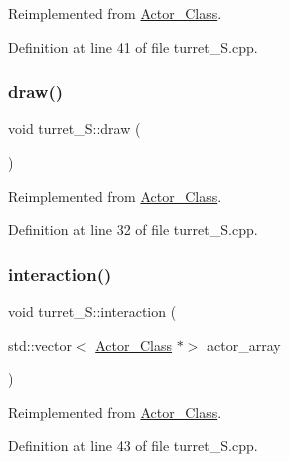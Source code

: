 Reimplemented from \hyperlink{class_actor___class_a9447c6154a674d7e6bdf24ff2874b7a8}{Actor\+\_\+\+Class}.



Definition at line 41 of file turret\+\_\+\+S.\+cpp.

\hypertarget{classturret___s_ad5699c9932a20914961dde81c5a96d86}{}\label{classturret___s_ad5699c9932a20914961dde81c5a96d86} 
\subsubsection{\texorpdfstring{draw()}{draw()}}
{\footnotesize\ttfamily void turret\+\_\+\+S\+::draw (\begin{DoxyParamCaption}{ }\end{DoxyParamCaption})\hspace{0.3cm}{\ttfamily [virtual]}}



Reimplemented from \hyperlink{class_actor___class_ac49cd62be76b4b950ecbe155413f1b64}{Actor\+\_\+\+Class}.



Definition at line 32 of file turret\+\_\+\+S.\+cpp.

\hypertarget{classturret___s_ae7e579ddf3982d6914491784595f1c16}{}\label{classturret___s_ae7e579ddf3982d6914491784595f1c16} 
\subsubsection{\texorpdfstring{interaction()}{interaction()}}
{\footnotesize\ttfamily void turret\+\_\+\+S\+::interaction (\begin{DoxyParamCaption}\item[{std\+::vector$<$ \hyperlink{class_actor___class}{Actor\+\_\+\+Class} $\ast$$>$}]{actor\+\_\+array }\end{DoxyParamCaption})\hspace{0.3cm}{\ttfamily [virtual]}}



Reimplemented from \hyperlink{class_actor___class_a87d1e079d8576fa99592a60b38a04a1b}{Actor\+\_\+\+Class}.



Definition at line 43 of file turret\+\_\+\+S.\+cpp.

\hypertarget{classturret___s_ab4ac035f439af50905a72227b19072a9}{}\label{classturret___s_ab4ac035f439af50905a72227b19072a9} 
